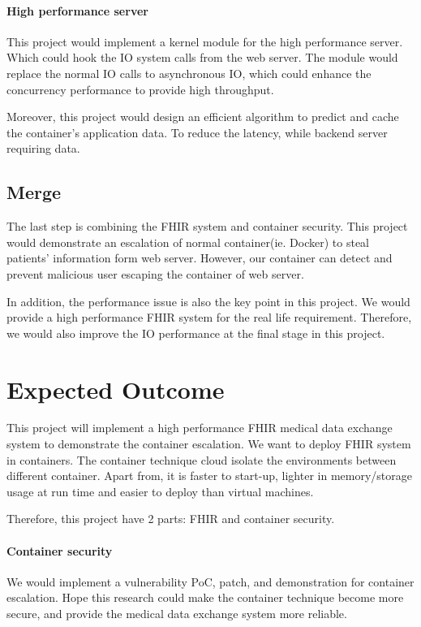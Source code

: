 \documentclass[12pt,a4paper]{IEEEconf}
\begin{document}
\paragraph{High performance server}
This project would implement a kernel module for the high performance server. Which could hook the IO
system calls from the web server. The module would replace the normal IO calls to asynchronous IO,
which could enhance the concurrency performance to provide high throughput.

Moreover, this project would design an efficient algorithm to predict and cache the container's
application data. To reduce the latency, while backend server requiring data.

\subsection{Merge}
The last step is combining the FHIR system and container security. This project would demonstrate
an escalation of normal container(ie. Docker) to steal patients' information form web server.
However, our container can detect and prevent malicious user escaping the container of web server.

In addition, the performance issue is also the key point in this project. We would provide a
high performance FHIR system for the real life requirement. Therefore, we would also improve the
IO performance at the final stage in this project.


\section{Expected Outcome}
This project will implement a high performance FHIR medical data exchange system to demonstrate
the container escalation. We want to deploy FHIR system in containers. The container technique
cloud isolate the environments between different container. Apart from, it is faster to start-up,
lighter in memory/storage usage at run time and easier to deploy than virtual machines.

Therefore, this project have 2 parts: FHIR and container security.
\paragraph{Container security}
We would implement a vulnerability PoC, patch, and demonstration for container escalation.
Hope this research could make the container technique become more secure, and provide the medical
data exchange system more reliable.
\end{document}
